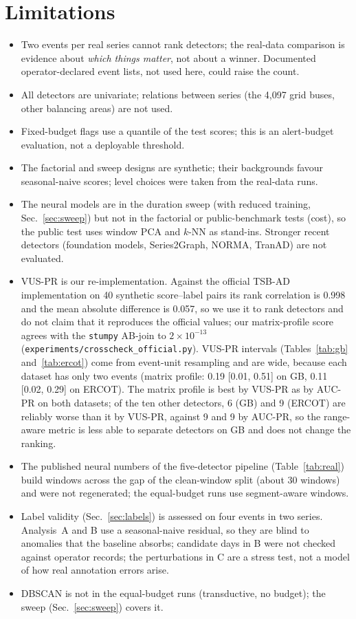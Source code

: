 \documentclass[10pt,twocolumn]{article}
\begin{document}
\section{Limitations}\label{sec:limits}
\begin{itemize}
\item Two events per real series cannot rank detectors; the real-data comparison is evidence about \emph{which things matter}, not about a winner. Documented operator-declared event lists, not used here, could raise the count.
\item All detectors are univariate; relations between series (the 4{,}097 grid buses, other balancing areas) are not used.
\item Fixed-budget flags use a quantile of the test scores; this is an alert-budget evaluation, not a deployable threshold.
\item The factorial and sweep designs are synthetic; their backgrounds favour seasonal-naive scores; level choices were taken from the real-data runs.
\item The neural models are in the duration sweep (with reduced training, Sec.~\ref{sec:sweep}) but not in the factorial or public-benchmark tests (cost), so the public test uses window PCA and $k$-NN as stand-ins. Stronger recent detectors (foundation models, Series2Graph, NORMA, TranAD) are not evaluated.
\item VUS-PR is our re-implementation. Against the official TSB-AD~\cite{liu2024elephant} implementation on 40 synthetic score--label pairs its rank correlation is 0.998 and the mean absolute difference is 0.057, so we use it to rank detectors and do not claim that it reproduces the official values; our matrix-profile score agrees with the \texttt{stumpy} AB-join to $2\times10^{-13}$ (\texttt{experiments/crosscheck\_official.py}). VUS-PR intervals (Tables~\ref{tab:gb} and~\ref{tab:ercot}) come from event-unit resampling and are wide, because each dataset has only two events (matrix profile: 0.19 [0.01, 0.51] on GB, 0.11 [0.02, 0.29] on ERCOT). The matrix profile is best by VUS-PR as by AUC-PR on both datasets; of the ten other detectors, 6 (GB) and 9 (ERCOT) are reliably worse than it by VUS-PR, against 9 and 9 by AUC-PR, so the range-aware metric is less able to separate detectors on GB and does not change the ranking.
\item The published neural numbers of the five-detector pipeline (Table~\ref{tab:real}) build windows across the gap of the clean-window split (about 30 windows) and were not regenerated; the equal-budget runs use segment-aware windows.
\item Label validity (Sec.~\ref{sec:labels}) is assessed on four events in two series. Analysis~A and B use a seasonal-naive residual, so they are blind to anomalies that the baseline absorbs; candidate days in B were not checked against operator records; the perturbations in C are a stress test, not a model of how real annotation errors arise.
\item DBSCAN is not in the equal-budget runs (transductive, no budget); the sweep (Sec.~\ref{sec:sweep}) covers it.
\end{itemize}
\end{document}
